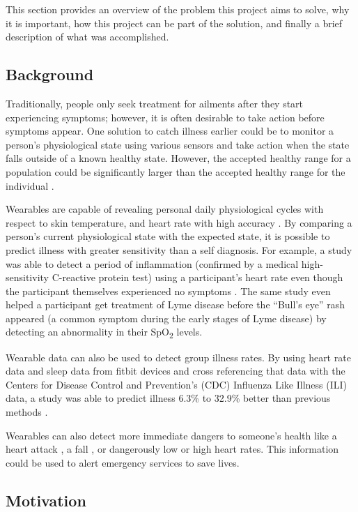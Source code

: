 This section provides an overview of the problem this project aims to solve,
why it is important, how this project can be part of the solution, and finally
a brief description of what was accomplished. 

\subsection{Background}

Traditionally, people only seek treatment for ailments after they start
experiencing symptoms; however, it is often desirable to take action before
symptoms appear.  One solution to catch illness earlier could be to monitor a
person's physiological state using various sensors and take action when the
state falls outside of a known healthy state.  However, the accepted healthy
range for a population could be significantly larger than the accepted healthy
range for the individual \cite{Wearable-tracking2017}.

Wearables are capable of revealing personal daily physiological cycles with
respect to skin temperature, and heart rate with high accuracy
\cite{Wearable-tracking2017}. By comparing a person's current physiological
state with the expected state, it is possible to predict illness with greater
sensitivity than a self diagnosis. For example, a study was able to detect a
period of inflammation (confirmed by a medical high-sensitivity C-reactive
protein test) using a participant's heart rate even though the participant
themselves experienced no symptoms \cite{Wearable-tracking2017}.  The same
study even helped a participant get treatment of Lyme disease before the
``Bull's eye'' rash appeared (a common symptom during the early stages of Lyme
disease) by detecting an abnormality in their SpO\textsubscript{2} levels.

Wearable data can also be used to detect group illness rates.  By using heart
rate data and sleep data from fitbit devices and cross referencing that data
with the Centers for Disease Control and Prevention's (CDC) Influenza Like
Illness (ILI) data, a study was able to predict illness 6.3\% to 32.9\% better
than previous methods \cite{Radin2020}.

Wearables can also detect more immediate dangers to someone's health like a
heart attack \cite{heart-attack}, a fall \cite{Khojasteh_2018}, or dangerously
low or high heart rates.  This information could be used to alert emergency
services to save lives.

\subsection{Motivation}

